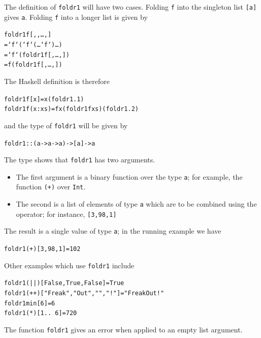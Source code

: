The definition of \texttt{foldr1} will have two cases. 
Folding \texttt{f} into the singleton list \texttt{[a]} gives \texttt{a}.
Folding \texttt{f} into a longer list is given by 
\begin{alltt}
foldr1 f [\eone,\etwo,\ldots,]
  = \eone `f` (\etwo `f` ( \ldots `f` )\ldots)
  = \eone `f` (foldr1 f [\etwo,\ldots,])
  = f \eone (foldr1 f [\etwo,\ldots,])
\end{alltt}
The Haskell definition is therefore
\begin{alltt}
foldr1 f [x]    = x\hfill(foldr1.1)
foldr1 f (x:xs) = f x (foldr1 f xs)\hfill(foldr1.2)
\end{alltt}
and the type of \texttt{foldr1} will be given by
\begin{alltt}
foldr1 :: (a -> a -> a) -> [a] -> a
\end{alltt}
The type shows that \texttt{foldr1} has two arguments.
\begin{itemize}
\item The first argument is a binary function over the type \texttt{a}; for
example, the function \texttt{(+)} over \texttt{Int}.
\item The second is a list of elements of type \texttt{a} which are to
be combined using the operator; for instance, \texttt{[3,98,1]}
\end{itemize}
The result is a single value of type \texttt{a}; in the running example we
have 
\begin{alltt}
foldr1 (+) [3,98,1] = 102
\end{alltt}
Other examples which use \texttt{foldr1} include
\begin{alltt}
foldr1 (||) [False,True,False] = True
foldr1 (++) ["Freak ", "Out" , "", "!"] = "Freak Out!"
foldr1 min [6] = 6
foldr1 (*) [1 ..\ 6] = 720
\end{alltt}
The function \texttt{foldr1} gives an error when applied to an empty list argument.

